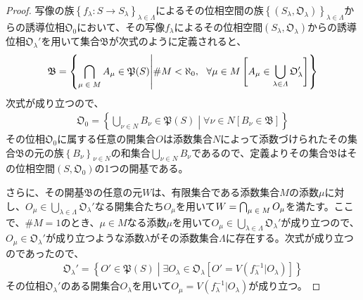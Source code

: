 \documentclass[dvipdfmx]{jsarticle}
\begin{document}
\begin{proof}
写像の族$\left\{ f_{\lambda}:S \rightarrow S_{\lambda} \right\}_{\lambda \in \varLambda}$によるその位相空間の族$\left\{ \left( S_{\lambda},\mathfrak{O}_{\lambda} \right) \right\}_{\lambda \in \varLambda}$からの誘導位相$\mathfrak{O}_{0}$において、その写像$f_{\lambda}$によるその位相空間$\left( S_{\lambda},\mathfrak{O}_{\lambda} \right)$からの誘導位相$\mathfrak{O}_{\lambda}'$を用いて集合$\mathfrak{B}$が次式のように定義されると、
\begin{align*}
\mathfrak{B} =\left\{ \bigcap_{\scriptsize \begin{matrix}
\mu \in M \\
\end{matrix}} A_{\mu}\in \mathfrak{P}(S) \middle| {\#}M < \aleph_{0},\ \ \forall\mu \in M\left[ A_{\mu} \in \bigcup_{\lambda \in \varLambda} \mathfrak{O}_{\lambda}' \right] \right\}
\end{align*}
次式が成り立つので、
\begin{align*}
\mathfrak{O}_{0} = \left\{ \bigcup_{\nu \in N} B_{\nu}\in \mathfrak{P}(S) \middle| \forall\nu \in N\left[ B_{\nu}\in \mathfrak{B} \right] \right\}
\end{align*}
その位相$\mathfrak{O}_{0}$に属する任意の開集合$O$は添数集合$N$によって添数づけられたその集合$\mathfrak{B}$の元の族$\left\{ B_{\nu} \right\}_{\nu \in N}$の和集合$\bigcup_{\nu \in N} B_{\nu}$であるので、定義よりその集合$\mathfrak{B}$はその位相空間$\left( S,\mathfrak{O}_{0} \right)$の1つの開基である。\par
さらに、その開基$\mathfrak{B}$の任意の元$W$は、有限集合である添数集合$M$の添数$\mu$に対し、$O_{\mu} \in \bigcup_{\lambda \in \varLambda} \mathfrak{O}_{\lambda}'$なる開集合たち$O_{\mu}$を用いて$W = \bigcap_{\scriptsize \begin{matrix}
\mu \in M \\
\end{matrix}} O_{\mu}$を満たす。ここで、${\#}M = 1$のとき、$\mu \in M$なる添数$\mu$を用いて$O_{\mu} \in \bigcup_{\lambda \in \varLambda} \mathfrak{O}_{\lambda}'$が成り立つので、$O_{\mu} \in \mathfrak{O}_{\lambda}'$が成り立つような添数$\lambda$がその添数集合$\varLambda$に存在する。次式が成り立つのであったので、
\begin{align*}
\mathfrak{O}_{\lambda}' = \left\{ O'\in \mathfrak{P}(S) \middle| \exists O_{\lambda} \in \mathfrak{O}_{\lambda}\left[ O' = V\left( f_{\lambda}^{- 1}|O_{\lambda} \right) \right] \right\}
\end{align*}
その位相$\mathfrak{O}_{\lambda}'$のある開集合$O_{\lambda}$を用いて$O_{\mu} = V\left( f_{\lambda}^{- 1}|O_{\lambda} \right)$が成り立つ。\par

\end{proof}
\end{document}
